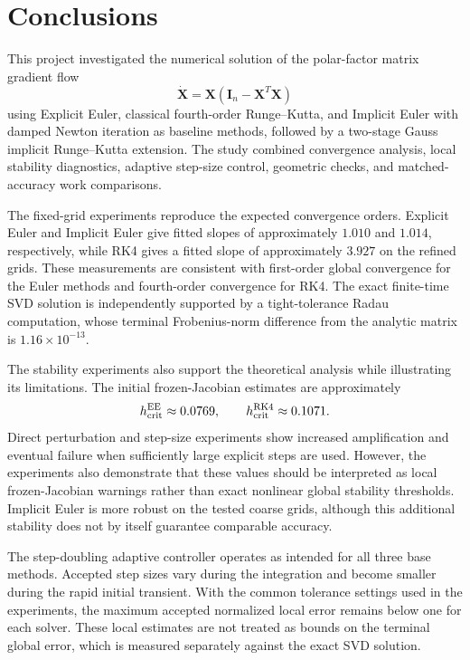 \section{Conclusions}

This project investigated the numerical solution of the polar-factor
matrix gradient flow
\[
\dot{\mathbf{X}}
=
\mathbf{X}
\left(
\mathbf{I}_n-\mathbf{X}^T\mathbf{X}
\right)
\]
using Explicit Euler, classical fourth-order Runge--Kutta, and Implicit
Euler with damped Newton iteration as baseline methods, followed by a
two-stage Gauss implicit Runge--Kutta extension. The study combined convergence
analysis, local stability diagnostics, adaptive step-size control,
geometric checks, and matched-accuracy work comparisons.

The fixed-grid experiments reproduce the expected convergence orders.
Explicit Euler and Implicit Euler give fitted slopes of approximately
$1.010$ and $1.014$, respectively, while RK4 gives a fitted slope of
approximately $3.927$ on the refined grids. These measurements are
consistent with first-order global convergence for the Euler methods
and fourth-order convergence for RK4. The exact finite-time SVD solution
is independently supported by a tight-tolerance Radau computation,
whose terminal Frobenius-norm difference from the analytic matrix is
$1.16\times10^{-13}$.

The stability experiments also support the theoretical analysis while
illustrating its limitations. The initial frozen-Jacobian estimates are
approximately
\[
h_{\rm crit}^{\rm EE}\approx0.0769,
\qquad
h_{\rm crit}^{\rm RK4}\approx0.1071.
\]
Direct perturbation and step-size experiments show increased
amplification and eventual failure when sufficiently large explicit
steps are used. However, the experiments also demonstrate that these
values should be interpreted as local frozen-Jacobian warnings rather
than exact nonlinear global stability thresholds. Implicit Euler is
more robust on the tested coarse grids, although this additional
stability does not by itself guarantee comparable accuracy.

The step-doubling adaptive controller operates as intended for all three
base methods. Accepted step sizes vary during the integration and become
smaller during the rapid initial transient. With the common tolerance
settings used in the experiments, the maximum accepted normalized local
error remains below one for each solver. These local estimates are not
treated as bounds on the terminal global error, which is measured
separately against the exact SVD solution.

